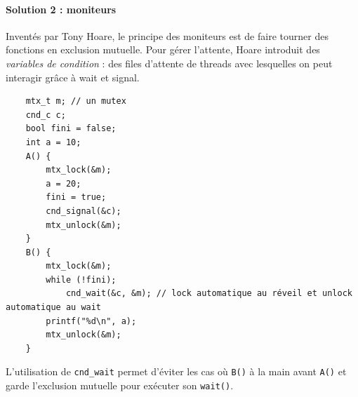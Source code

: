 \documentclass[11pt]{article}
\begin{document}
\paragraph{Solution 2 : moniteurs}
Inventés par Tony Hoare, le principe des moniteurs est de faire tourner des fonctions en exclusion mutuelle. Pour gérer l'attente, Hoare introduit des \textit{variables de condition} : des files d'attente de threads avec lesquelles on peut interagir grâce à wait et signal.
\begin{verbatim}
    mtx_t m; // un mutex
    cnd_c c;
    bool fini = false;
    int a = 10;
    A() {
        mtx_lock(&m);
        a = 20;
        fini = true;
        cnd_signal(&c);
        mtx_unlock(&m);
    }
    B() {
        mtx_lock(&m);
        while (!fini);
            cnd_wait(&c, &m); // lock automatique au réveil et unlock automatique au wait
        printf("%d\n", a);
        mtx_unlock(&m);
    }
\end{verbatim}

L'utilisation de \texttt{cnd_wait} permet d'éviter les cas où \texttt{B()} à la main avant \texttt{A()} et garde l'exclusion mutuelle pour exécuter son \texttt{wait()}.
\end{document}

